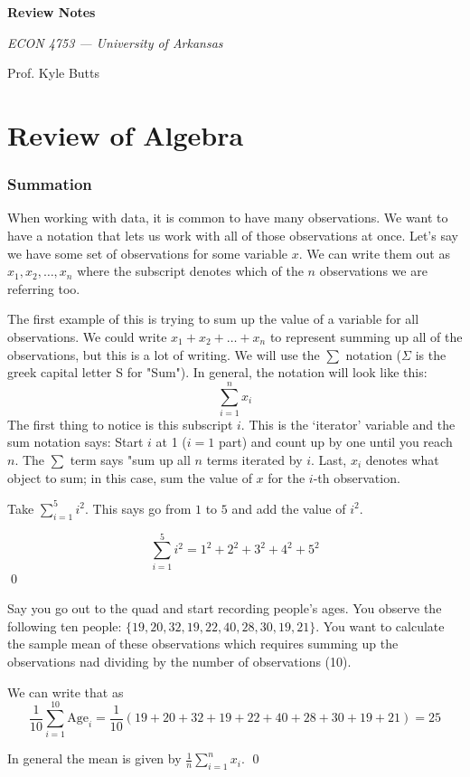 \documentclass[12pt]{article}
\begin{document}
\begin{center}
  {\Huge\bf Review Notes}
  
  \smallskip
  {\large\it ECON 4753 — University of Arkansas}

  \medskip
  {\large Prof. Kyle Butts}
\end{center}

\part{Review of Algebra}

\section{Summation}

When working with data, it is common to have many observations. We want to have a notation that lets us work with all of those observations at once. Let's say we have some set of observations for some variable $x$. We can write them out as $x_1, x_2, \dots, x_n$ where the subscript denotes which of the $n$ observations we are referring too.

The first example of this is trying to sum up the value of a variable for all observations. We could write $x_1 + x_2 + \dots + x_n$ to represent summing up all of the observations, but this is a lot of writing. 
We will use the $\sum$ notation ($\Sigma$ is the greek capital letter S for "Sum"). 
In general, the notation will look like this:
\begin{equation} 
  \sum_{i = 1}^n x_i
\end{equation}
The first thing to notice is this subscript $i$. This is the `iterator' variable and the sum notation says: Start $i$ at 1 ($i = 1$ part) and count up by one until you reach $n$. The $\sum$ term says "sum up all $n$ terms iterated by $i$. Last, $x_i$ denotes what object to sum; in this case, sum the value of $x$ for the $i$-th observation.

\begin{example}
  Take $\sum_{i=1}^5 i^2$. This says go from $1$ to $5$ and add the value of $i^2$. 
  
  $$
    \sum_{i=1}^5 i^2 = 1^2 + 2^2 + 3^2 + 4^2 + 5^2
  $$
  \qed
\end{example}

\begin{example}
  Say you go out to the quad and start recording people's ages. You observe the following ten people: $\{ 19, 20, 32, 19, 22, 40, 28, 30, 19, 21 \}$. You want to calculate the sample mean of these observations which requires summing up the observations nad dividing by the number of observations (10). 
  
  We can write that as
  $$
    \frac{1}{10} \sum_{i=1}^{10} \text{Age}_i = \frac{1}{10} \left( 19 + 20 + 32 + 19 + 22 + 40 + 28 + 30 + 19 + 21 \right) = 25
  $$
  
  In general the mean is given by $\frac{1}{n} \sum_{i=1}^n x_i$. \qed
\end{example}
\end{document}
